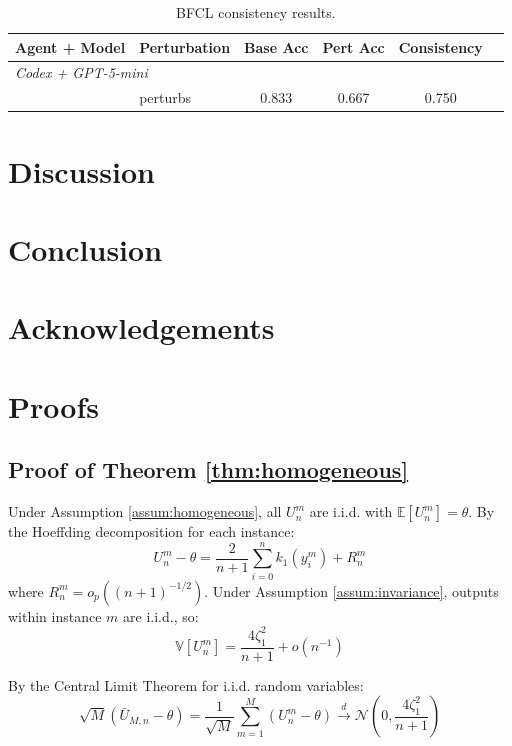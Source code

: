 \documentclass{article}
\theoremstyle{plain}
\theoremstyle{definition}
\theoremstyle{remark}
\begin{document}
\begin{table}[h]
\centering
\caption{BFCL consistency results.}
\label{tab:bfcl}
\begin{tabular}{llcccc}
\toprule
Agent + Model & Perturbation & Base Acc & Pert Acc & Consistency \\
\midrule
\multicolumn{5}{l}{\textit{Codex + GPT-5-mini}} \\
 & perturbs & 0.833 & 0.667 & 0.750 \\
\bottomrule
\end{tabular}
\end{table}

\section{Discussion}

\section{Conclusion}

\section*{Acknowledgements}




\appendix

\section{Proofs}

\subsection{Proof of Theorem \ref{thm:homogeneous}}

Under Assumption \ref{assum:homogeneous}, all $U_n^m$ are i.i.d. with $\mathbb E[U_n^m] = \theta$. By the Hoeffding decomposition for each instance:
\begin{equation}
    U_n^m - \theta = \frac{2}{n+1}\sum_{i=0}^n k_1(y_i^m) + R_n^m
\end{equation}
where $R_n^m = o_p((n+1)^{-1/2})$. Under Assumption \ref{assum:invariance}, outputs within instance $m$ are i.i.d., so:
\begin{equation}
    \mathbb V[U_n^m] = \frac{4\zeta_1^2}{n+1} + o(n^{-1})
\end{equation}

By the Central Limit Theorem for i.i.d. random variables:
\begin{equation}
    \sqrt{M}(\bar{U}_{M,n} - \theta) = \frac{1}{\sqrt{M}}\sum_{m=1}^M (U_n^m - \theta) \xrightarrow{d} \mathcal{N}\left(0, \frac{4\zeta_1^2}{n+1}\right)
\end{equation}
\end{document}
